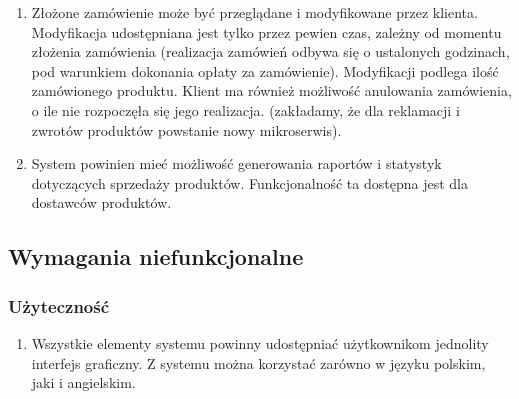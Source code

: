 \documentclass[11pt,a4paper,twoside]{article}
\begin{document}
\begin{enumerate}[start=1,label={WF\arabic*.}]
\item Złożone zamówienie może być przeglądane i modyfikowane przez klienta. Modyfikacja udostępniana jest tylko przez pewien czas, zależny od momentu złożenia zamówienia (realizacja zamówień odbywa się o ustalonych godzinach, pod warunkiem dokonania opłaty za zamówienie). Modyfikacji podlega ilość zamówionego produktu. Klient ma również możliwość anulowania zamówienia, o ile nie rozpoczęła się jego realizacja. (zakładamy, że dla reklamacji i zwrotów produktów powstanie nowy mikroserwis). 
\item \label{statystyki} System powinien mieć możliwość generowania raportów i statystyk dotyczących sprzedaży produktów. Funkcjonalność ta dostępna jest dla dostawców produktów.
\end{enumerate}

\subsection{Wymagania niefunkcjonalne}
\subsubsection{Użyteczność}
\begin{enumerate}[start=1,label={WNF\arabic*.}]
\item Wszystkie elementy systemu powinny udostępniać użytkownikom jednolity interfejs graficzny. Z systemu można korzystać zarówno w języku polskim, jaki i angielskim.
\end{enumerate}
\end{document}
